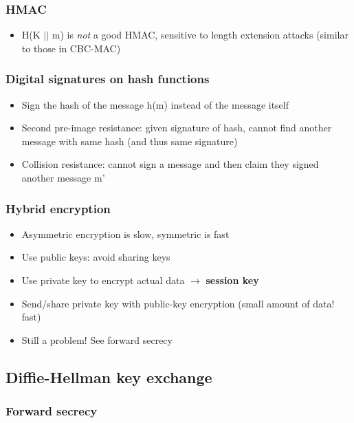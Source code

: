 \documentclass{article}
\newenvironment{myitemize}
{ \begin{itemize}
    \setlength{\itemsep}{005pt}
    \setlength{\parskip}{0pt}
    \setlength{\parsep}{0pt}     }
{ \end{itemize}                  }
\begin{document}
\begin{multicols}{2}
\subsubsection{HMAC}

\begin{myitemize}
    \item H(K $||$ m) is \emph{not} a good HMAC, sensitive to length extension attacks (similar to those in CBC-MAC)
\end{myitemize}

\subsubsection{Digital signatures on hash functions}

\begin{myitemize}
    \item Sign the hash of the message h(m) instead of the message itself
    \item Second pre-image resistance: given signature of hash, cannot find another message with same hash (and thus same signature)
    \item Collision resistance: cannot sign a message and then claim they signed another message m'
\end{myitemize}

\subsubsection{Hybrid encryption}

\begin{myitemize}
    \item Asymmetric encryption is slow, symmetric is fast
    \item Use public keys: avoid sharing keys
    \item Use private key to encrypt actual data $\rightarrow$ \textbf{session key}
    \item Send/share private key with public-key encryption (small amount of data! fast)
    \item Still a problem! See forward secrecy
\end{myitemize}


\subsection{Diffie-Hellman key exchange}

\subsubsection{Forward secrecy}


\end{multicols}
\end{document}
